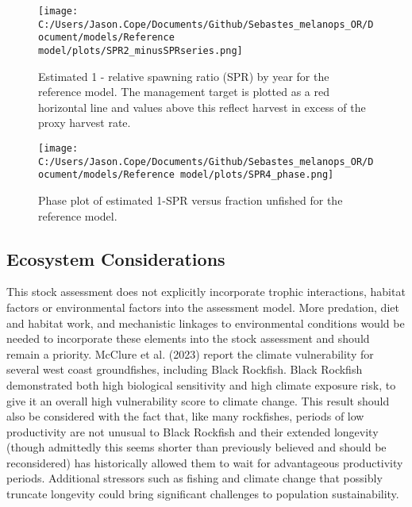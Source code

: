 \documentclass[11pt,
  letterpaper,
]{article}
\begin{document}


\clearpage

\begin{figure}
{\centering
\texttt{[image: C:/Users/Jason.Cope/Documents/Github/Sebastes\_melanops\_OR/Document/models/Reference model/plots/SPR2\_minusSPRseries.png]}
}
\caption{Estimated 1 - relative spawning ratio (SPR) by year for the reference model. The management target is plotted as a red horizontal line and values above this reflect harvest in excess of the proxy harvest rate.\label{fig:es-1-spr}}
\end{figure}

\begin{figure}
{\centering
\texttt{[image: C:/Users/Jason.Cope/Documents/Github/Sebastes\_melanops\_OR/Document/models/Reference model/plots/SPR4\_phase.png]}
}
\caption{Phase plot of estimated 1-SPR versus fraction unfished for the reference model.\label{fig:es-phase}}
\end{figure}

\clearpage

\hypertarget{ecosystem-considerations}{%
\subsection*{Ecosystem Considerations}\label{ecosystem-considerations}}

This stock assessment does not explicitly incorporate trophic interactions, habitat factors or environmental factors into the assessment model. More predation, diet and habitat work, and mechanistic linkages to environmental conditions would be needed to incorporate these elements into the stock assessment and should remain a priority. McClure et al. (2023) report the climate vulnerability for several west coast groundfishes, including Black Rockfish. Black Rockfish demonstrated both high biological sensitivity and high climate exposure risk, to give it an overall high vulnerability score to climate change. This result should also be considered with the fact that, like many rockfishes, periods of low productivity are not unusual to Black Rockfish and their extended longevity (though admittedly this seems shorter than previously believed and should be reconsidered) has historically allowed them to wait for advantageous productivity periods. Additional stressors such as fishing and climate change that possibly truncate longevity could bring significant challenges to population sustainability.
\end{document}
